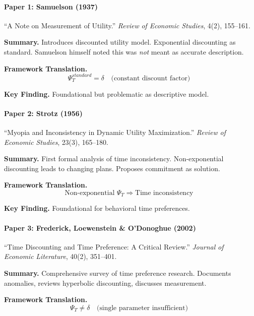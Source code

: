 \paragraph{Paper 1: Samuelson (1937)}

``A Note on Measurement of Utility.''
\textit{Review of Economic Studies}, 4(2), 155--161.

\textbf{Summary.}
Introduces discounted utility model. Exponential discounting as standard.
Samuelson himself noted this was \textit{not} meant as accurate description.

\textbf{Framework Translation.}
\begin{equation}
\Psi_T^{standard} = \delta \quad \text{(constant discount factor)}
\end{equation}

\textbf{Key Finding.}
Foundational but problematic as descriptive model.

\paragraph{Paper 2: Strotz (1956)}

``Myopia and Inconsistency in Dynamic Utility Maximization.''
\textit{Review of Economic Studies}, 23(3), 165--180.

\textbf{Summary.}
First formal analysis of time inconsistency. Non-exponential discounting 
leads to changing plans. Proposes commitment as solution.

\textbf{Framework Translation.}
\begin{equation}
\text{Non-exponential } \Psi_T \Rightarrow \text{Time inconsistency}
\end{equation}

\textbf{Key Finding.}
Foundational for behavioral time preferences.

\paragraph{Paper 3: Frederick, Loewenstein \& O'Donoghue (2002)}

``Time Discounting and Time Preference: A Critical Review.''
\textit{Journal of Economic Literature}, 40(2), 351--401.

\textbf{Summary.}
Comprehensive survey of time preference research. Documents anomalies, 
reviews hyperbolic discounting, discusses measurement.

\textbf{Framework Translation.}
\begin{equation}
\Psi_T \neq \delta \quad \text{(single parameter insufficient)}
\end{equation}

